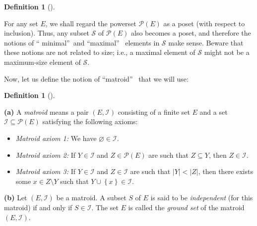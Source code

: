 \documentclass[numbers=enddot,12pt,final,onecolumn,notitlepage]{scrartcl}%
\theoremstyle{definition}
\newtheorem{defi}[theo]{Definition}
\newenvironment{definition}[1][]
{\begin{defi}[#1]\begin{leftbar}}
{\end{leftbar}\end{defi}}
\begin{document}
\begin{definition}
\label{def.poset.P(E)}For any set $E$, we shall regard the powerset
$\mathcal{P}\left(  E\right)  $ as a poset (with respect to inclusion). Thus,
any subset $\mathcal{S}$ of $\mathcal{P}\left(  E\right)  $ also becomes a
poset, and therefore the notions of \textquotedblleft
minimal\textquotedblright\ and \textquotedblleft maximal\textquotedblright%
\ elements in $\mathcal{S}$ make sense. Beware that these notions are not
related to size; i.e., a maximal element of $\mathcal{S}$ might not be a
maximum-size element of $\mathcal{S}$.
\end{definition}

Now, let us define the notion of \textquotedblleft matroid\textquotedblright%
\ that we will use:

\begin{definition}
\label{def.matroid}\textbf{(a)} A \emph{matroid} means a pair $\left(
E,\mathcal{I}\right)  $ consisting of a finite set $E$ and a set
$\mathcal{I}\subseteq\mathcal{P}\left(  E\right)  $ satisfying the following axioms:

\begin{itemize}
\item \textit{Matroid axiom 1:} We have $\varnothing\in\mathcal{I}$.

\item \textit{Matroid axiom 2:} If $Y\in\mathcal{I}$ and $Z\in\mathcal{P}%
\left(  E\right)  $ are such that $Z\subseteq Y$, then $Z\in\mathcal{I}$.

\item \textit{Matroid axiom 3:} If $Y\in\mathcal{I}$ and $Z\in\mathcal{I}$ are
such that $\left\vert Y\right\vert <\left\vert Z\right\vert $, then there
exists some $x\in Z\setminus Y$ such that $Y\cup\left\{  x\right\}
\in\mathcal{I}$.
\end{itemize}

\textbf{(b)} Let $\left(  E,\mathcal{I}\right)  $ be a matroid. A subset $S$
of $E$ is said to be \emph{independent} (for this matroid) if and only if
$S\in\mathcal{I}$. The set $E$ is called the \emph{ground set} of the matroid
$\left(  E,\mathcal{I}\right)  $.
\end{definition}
\end{document}
